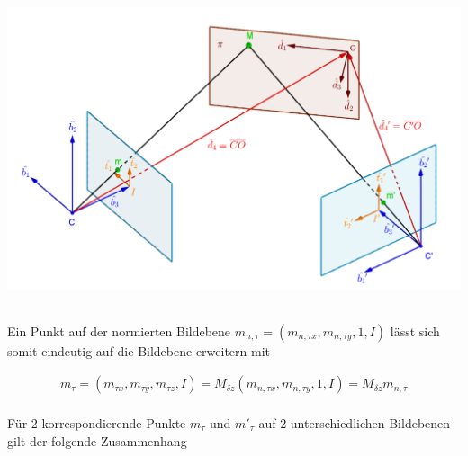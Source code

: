  
 
 
 
 \begin{minipage}{\linewidth}
 	\centering
 	\includegraphics[width=0.8\linewidth]{images/HomographieDP_beschriftet.png}
 \end{minipage}\\
 
 
 Ein Punkt auf der normierten Bildebene $m_{n,\tau}=(m_{n,\tau x},m_{n,\tau y},1, I)$ lässt sich somit eindeutig auf die Bildebene erweitern mit 
 
 \begin{gather}
 	m_{\tau}=(m_{\tau x},m_{\tau y},m_{\tau z}, I) = M_{\delta z}(m_{n,\tau x},m_{n,\tau y},1, I)=M_{\delta z}m_{n,\tau}
 \end{gather}\\
 
 Für 2 korrespondierende Punkte $m_{\tau}$ und $m'_{\tau}$ auf 2 unterschiedlichen Bildebenen gilt der folgende Zusammenhang
 
